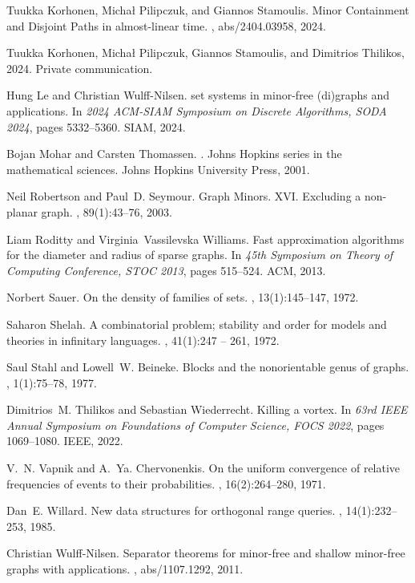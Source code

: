 \documentclass[11pt,a4paper]{article}
\begin{document}
\begin{thebibliography}{10}
  Tuukka Korhonen, Micha\l{} Pilipczuk, and Giannos Stamoulis.
  \newblock Minor {C}ontainment and {D}isjoint {P}aths in almost-linear time.
  , abs/2404.03958, 2024.
  
  Tuukka Korhonen, Micha\l{} Pilipczuk, Giannos Stamoulis, and Dimitrios Thilikos, 2024.
  \newblock Private communication.
  
  Hung Le and Christian Wulff{-}Nilsen.
   set systems in minor-free (di)graphs and applications.
  \newblock In {\em 2024 {ACM-SIAM} Symposium on Discrete Algorithms, {SODA} 2024}, pages 5332--5360. {SIAM}, 2024.
  
  Bojan Mohar and Carsten Thomassen.
  .
  \newblock Johns Hopkins series in the mathematical sciences. Johns Hopkins University Press, 2001.
  
  Neil Robertson and Paul~D. Seymour.
  \newblock Graph {M}inors. {XVI.} {E}xcluding a non-planar graph.
  , 89(1):43--76, 2003.
  
  Liam Roditty and Virginia~Vassilevska Williams.
  \newblock Fast approximation algorithms for the diameter and radius of sparse graphs.
  \newblock In {\em 45th Symposium on Theory of Computing Conference, STOC 2013}, pages 515--524. {ACM}, 2013.
  
  Norbert Sauer.
  \newblock On the density of families of sets.
  , 13(1):145--147, 1972.
  
  Saharon Shelah.
  \newblock A combinatorial problem; stability and order for models and theories in infinitary languages.
  , 41(1):247 -- 261, 1972.
  
  Saul Stahl and Lowell~W. Beineke.
  \newblock Blocks and the nonorientable genus of graphs.
  , 1(1):75--78, 1977.
  
  Dimitrios~M. Thilikos and Sebastian Wiederrecht.
  \newblock Killing a vortex.
  \newblock In {\em 63rd {IEEE} Annual Symposium on Foundations of Computer Science, {FOCS} 2022}, pages 1069--1080. {IEEE}, 2022.
  
  V.~N. Vapnik and A.~Ya. Chervonenkis.
  \newblock On the uniform convergence of relative frequencies of events to their probabilities.
  , 16(2):264--280, 1971.
  
  Dan~E. Willard.
  \newblock New data structures for orthogonal range queries.
  , 14(1):232--253, 1985.
  
  Christian Wulff{-}Nilsen.
  \newblock Separator theorems for minor-free and shallow minor-free graphs with applications.
  , abs/1107.1292, 2011.
  
  \end{thebibliography}
\end{document}
